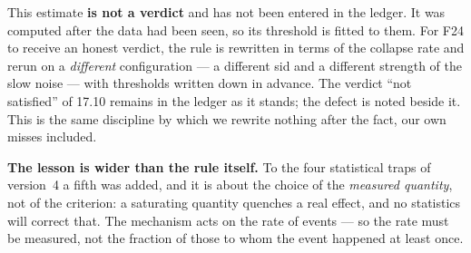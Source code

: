 \begin{note}
This estimate \textbf{is not a verdict} and has not been entered in the ledger. It was computed after the data had been seen, so its threshold is fitted to them. For F24 to receive an honest verdict, the rule is rewritten in terms of the collapse rate and rerun on a \emph{different} configuration --- a different sid and a different strength of the slow noise --- with thresholds written down in advance. The verdict ``not satisfied'' of 17.10 remains in the ledger as it stands; the defect is noted beside it. This is the same discipline by which we rewrite nothing after the fact, our own misses included.
\end{note}

\textbf{The lesson is wider than the rule itself.} To the four statistical traps of version~4 a fifth was added, and it is about the choice of the \emph{measured quantity}, not of the criterion: a saturating quantity quenches a real effect, and no statistics will correct that. The mechanism acts on the rate of events --- so the rate must be measured, not the fraction of those to whom the event happened at least once.
